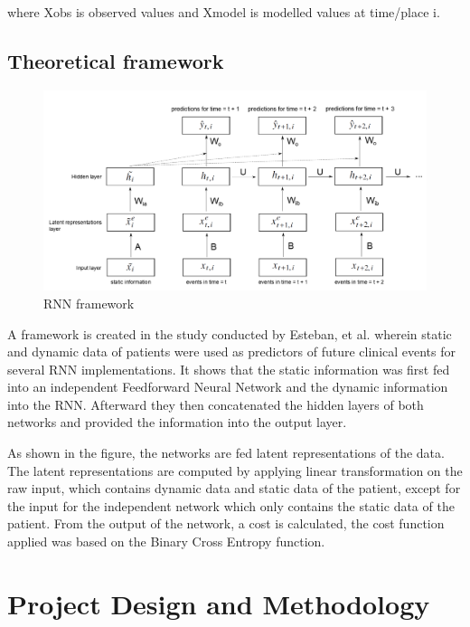 \documentclass[10pt,11pt,12pt,oneside]{book}
\begin{document}
    where Xobs is observed values and Xmodel is modelled values at time/place i.

   \pagebreak
    \section{Theoretical framework}
    \begin{figure} [ht]
        \includegraphics[width=6.5in]{rnnframework.png}
        \caption{RNN framework}
        \medskip
    \end{figure}
    A framework is created in the study conducted by Esteban, et al. wherein static and dynamic data of patients were used as predictors of future clinical events for several RNN implementations. It shows that the static information was first fed into an independent Feedforward Neural Network and the dynamic information into the RNN. Afterward they then concatenated the hidden layers of both networks and provided the information into the output layer.

    As shown in the figure, the networks are fed latent representations of the data. The latent representations are computed by applying linear transformation on the raw input, which contains dynamic data and static data of the patient, except for the input for the independent network which only contains the static data of the patient. From the output of the network, a cost is calculated, the cost function applied was based on the Binary Cross Entropy function. \cite{DBLP:journals/corr/EstebanSYT16}
    \FloatBarrier
\chapter{Project Design and Methodology}
\end{document}
